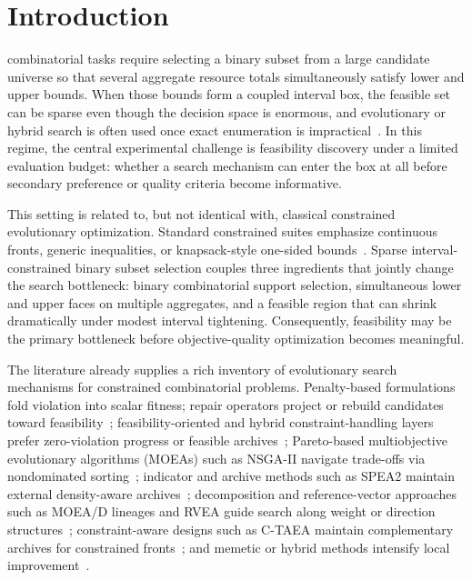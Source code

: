 \documentclass[lettersize,journal]{IEEEtran}
\begin{document}
\section{Introduction}
\label{sec:intro}
 combinatorial tasks require selecting a binary subset from a large candidate universe so that several aggregate resource totals simultaneously satisfy lower and upper bounds.
When those bounds form a coupled interval box, the feasible set can be sparse even though the decision space is enormous, and evolutionary or hybrid search is often used once exact enumeration is impractical~\cite{deb2002,zhang2007}.
In this regime, the central experimental challenge is feasibility discovery under a limited evaluation budget: whether a search mechanism can enter the box at all before secondary preference or quality criteria become informative.

This setting is related to, but not identical with, classical constrained evolutionary optimization.
Standard constrained suites emphasize continuous fronts, generic inequalities, or knapsack-style one-sided bounds~\cite{deb2002,zhang2007,cheng2016,li2019ctaea,zitzler2001}.
Sparse interval-constrained binary subset selection couples three ingredients that jointly change the search bottleneck: binary combinatorial support selection, simultaneous lower and upper faces on multiple aggregates, and a feasible region that can shrink dramatically under modest interval tightening.
Consequently, feasibility may be the primary bottleneck before objective-quality optimization becomes meaningful.

The literature already supplies a rich inventory of evolutionary search mechanisms for constrained combinatorial problems.
Penalty-based formulations fold violation into scalar fitness; repair operators project or rebuild candidates toward feasibility~\cite{zhunfan2015anoppositionbasec800,fukuhara2026ahybriddepsoalgo1602}; feasibility-oriented and hybrid constraint-handling layers prefer zero-violation progress or feasible archives~\cite{kan2017aconstrainedmult6073,yu2024adualpopulationc9fb6}; Pareto-based multiobjective evolutionary algorithms (MOEAs) such as NSGA-II navigate trade-offs via nondominated sorting~\cite{deb2002}; indicator and archive methods such as SPEA2 maintain external density-aware archives~\cite{zitzler2001}; decomposition and reference-vector approaches such as MOEA/D lineages and RVEA guide search along weight or direction structures~\cite{zhang2007,cheng2016}; constraint-aware designs such as C-TAEA maintain complementary archives for constrained fronts~\cite{li2019ctaea,li2022aconstrainedmultef18}; and memetic or hybrid methods intensify local improvement~\cite{rahman2019aneffectivememet26b9,derbel2025asimplecombinatia389,zhao2025acmodiet}.
\end{document}
